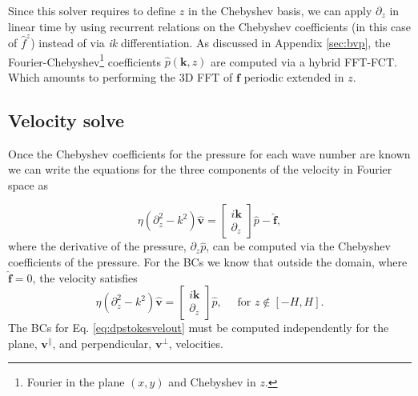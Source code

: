 \documentclass[twoside,openright,titlepage,numbers=noenddot,%
headinclude,footinclude,cleardoublepage=empty,abstract=on,
BCOR=5mm,fontsize=11pt, dvipsnames, paper=b5
]{scrreprt}
\renewcommand{\vec}[1]{\bm{#1}}
\newcommand{\fou}[1]{\widehat{#1}}
\newcommand{\fvel}{v}
\begin{document}
Since this solver requires to define $z$ in the Chebyshev basis, we can apply $\partial_z$ in linear time by using recurrent relations on the Chebyshev coefficients (in this case of $\fou{f}^z$) instead of via \emph{ik} differentiation. As discussed in Appendix \ref{sec:bvp}, the Fourier-Chebyshev\footnote{Fourier in the plane $(x,y)$ and Chebyshev in $z$.} coefficients $\fou{p}(\vec{k}, z)$ are computed via a hybrid \gls{FFT}-\gls{FCT}. Which amounts to performing the 3D \gls{FFT} of $\vec{f}$ periodic extended in $z$.

\subsection*{Velocity solve}
Once the Chebyshev coefficients for the pressure for each wave number are known we can write the equations for the three components of the velocity in Fourier space as

\begin{equation}
  \label{eq:dpstokesvel}
  \eta\left(\partial^2_{z} -k^2\right)\fou{\vec{\fvel}} = 
  \begin{bmatrix}
    i\vec{k}\\
    \partial_z
  \end{bmatrix}
  \fou{p} -\fou{\vec{f}},
\end{equation}
where the derivative of the pressure, $\partial_z\fou{p}$, can be computed via the Chebyshev coefficients of the pressure.
For the \glspl{BC} we know that outside the domain, where $\fou{\vec{f}} = 0$, the velocity satisfies
\begin{equation}
  \label{eq:dpstokesvelout}
  \eta\left(\partial^2_{z} -k^2\right)\fou{\vec{\fvel}} = 
  \begin{bmatrix}
    i\vec{k}\\
    \partial_z
  \end{bmatrix}
  \fou{p}, \quad \text{ for } z \notin [-H,H].
\end{equation}
The \glspl{BC} for Eq. \eqref{eq:dpstokesvelout} must be computed independently for the plane, $\vec{\fvel}^\parallel$, and perpendicular, $\vec{\fvel}^\perp$, velocities.
\end{document}
